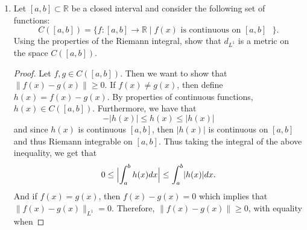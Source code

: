 \documentclass[12pt]{article}
\theoremstyle{definition}
\newcommand{\abs}[1]{\lvert #1 \rvert}
\newcommand{\bigabs}[1]{\Bigl \lvert #1 \Bigr \rvert}
\newcommand{\bigparen}[1]{\Bigl ( #1 \Bigr )}
\begin{document}
\begin{enumerate}
\begin{proof}
\begin{enumerate}
                            $1/x\not\in\mathbb{Z}_{+}$. In either case, we have
                            that $0<\abs{x}<1$. Therefore, $x\in E$ and 
                                \begin{equation*}
                                    E=(-1,
                                    0)\cup\bigcup_{n\in\mathbb{N}}\bigparen{\frac{1}{n+1},
                                    \frac{1}{n}}.
                                \end{equation*}
                            Thus $E$ is open in $\mathbb{R}$ and thus open in
                            $Y$.
                    \end{enumerate}
                \end{proof}
        \item Let $[a, b]\subset\mathbb{R}$ be a closed interval and consider
            the following set of functions:
                \begin{equation*}
                    C([a, b])=\{f:[a, b]\to\mathbb{R}\mid f(x)\text{ is
                    continuous on $[a, b]$ }\}. 
                \end{equation*}
            Using the properties of the Riemann integral, show that $d_{L^1}$
            is a metric on the space $C([a, b])$. 
                \begin{proof}
                    Let $f, g\in C([a, b])$. Then we want to show that
                    $\|f(x)-g(x)\|\geq 0$. If $f(x)\neq g(x)$, then define
                    $h(x)=f(x)-g(x)$. By properties of continuous functions,
                    $h(x)\in C([a, b])$. Furthermore, we have that
                        \begin{equation*}
                            -\abs{h(x)}\leq h(x)\leq \abs{h(x)}
                        \end{equation*}
                        and since $h(x)$ is continuous $[a, b]$, then $\abs{h(x)}$ is
                        continuous on $[a, b]$ and thus Riemann integrable on
                        $[a, b]$. Thus taking the integral of the above
                        inequality, we get that 
                        \begin{equation*}
                            0\leq\bigabs{\int_{a}^{b}h(x)dx}\leq\int_{a}^{b}\abs{h(x)}dx.
                        \end{equation*}
                    And if $f(x)=g(x)$, then $f(x)-g(x)=0$ which implies
                    that $\|f(x)-g(x)\|_{L^1}=0$. Therefore,
                    $\|f(x)-g(x)\|\geq 0$, with equality when

\end{proof}
\end{enumerate}
\end{document}
